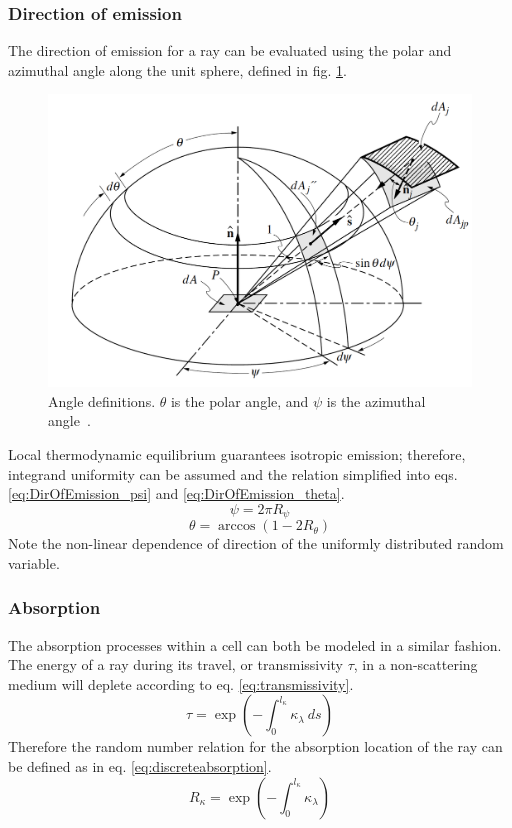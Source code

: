 \subsubsection{Direction of emission}
The direction of emission for a ray can be evaluated using the polar and azimuthal angle along the unit sphere, defined in fig. \ref{fig:Unit_Sphere}. 
\begin{figure}
\includegraphics[width=\linewidth]{figures/ch3/solid_angl.png}
\caption{Angle definitions. $\theta$ is the polar angle, and $\psi$ is the azimuthal angle~\cite{Modest2013RadiativeTransfer}. }
\label{fig:Unit_Sphere}
\end{figure}
Local thermodynamic equilibrium guarantees isotropic emission; therefore, integrand uniformity can be assumed and the relation simplified into eqs. \ref{eq:DirOfEmission_psi} and \ref{eq:DirOfEmission_theta}.
\begin{equation}
    \psi{} = 2\pi{}R_\psi{}
    \label{eq:DirOfEmission_psi}
\end{equation}
\begin{equation}
    \theta{}=\arccos{(1-2R_\theta{})}
    \label{eq:DirOfEmission_theta}
\end{equation}
Note the non-linear dependence of direction of the uniformly distributed random variable.

\subsubsection{Absorption}
The absorption processes within a cell can both be modeled in a similar fashion. The energy of a ray during its travel, or transmissivity $\tau{}$, in a non-scattering medium will deplete according to eq. \ref{eq:transmissivity}.
\begin{equation}
    \tau{}=\exp{\left(-\int^{l_\kappa{}}_0\kappa{}_\lambda{}~ds\right)}
    \label{eq:transmissivity}
\end{equation}
Therefore the random number relation for the absorption location of the ray can be defined as in eq. \ref{eq:discreteabsorption}.
\begin{equation}
    R_\kappa{}=\exp{\left(-\int_0^{l_\kappa}\kappa_\lambda{}\right)}
    \label{eq:discreteabsorption}
\end{equation}

